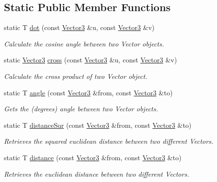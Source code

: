 \subsection*{Static Public Member Functions}
\begin{DoxyCompactItemize}
\item 
static T \hyperlink{classsparky_1_1_vector3_a32649249868aafd5a7aa412aba5a63d1}{dot} (const \hyperlink{classsparky_1_1_vector3}{Vector3} \&u, const \hyperlink{classsparky_1_1_vector3}{Vector3} \&v)
\begin{DoxyCompactList}\small\item\em Calculate the cosine angle between two Vector objects. \end{DoxyCompactList}\item 
static \hyperlink{classsparky_1_1_vector3}{Vector3} \hyperlink{classsparky_1_1_vector3_a707609704d1c3c85610f0ca069ec308c}{cross} (const \hyperlink{classsparky_1_1_vector3}{Vector3} \&u, const \hyperlink{classsparky_1_1_vector3}{Vector3} \&v)
\begin{DoxyCompactList}\small\item\em Calculate the cross product of two Vector object. \end{DoxyCompactList}\item 
static T \hyperlink{classsparky_1_1_vector3_aec0d68d5cc01ea352bd9aae991e7d35b}{angle} (const \hyperlink{classsparky_1_1_vector3}{Vector3} \&from, const \hyperlink{classsparky_1_1_vector3}{Vector3} \&to)
\begin{DoxyCompactList}\small\item\em Gets the (degrees) angle between two Vector objects. \end{DoxyCompactList}\item 
static T \hyperlink{classsparky_1_1_vector3_af91c74f1138c747e8a786acac3f1393c}{distance\+Sqr} (const \hyperlink{classsparky_1_1_vector3}{Vector3} \&from, const \hyperlink{classsparky_1_1_vector3}{Vector3} \&to)
\begin{DoxyCompactList}\small\item\em Retrieves the squared euclidean distance between two different Vectors. \end{DoxyCompactList}\item 
static T \hyperlink{classsparky_1_1_vector3_a3a0d035abb17942f1be7f5337265ed63}{distance} (const \hyperlink{classsparky_1_1_vector3}{Vector3} \&from, const \hyperlink{classsparky_1_1_vector3}{Vector3} \&to)
\begin{DoxyCompactList}\small\item\em Retrieves the euclidean distance between two different Vectors. \end{DoxyCompactList}\item 

\end{DoxyCompactItemize}
